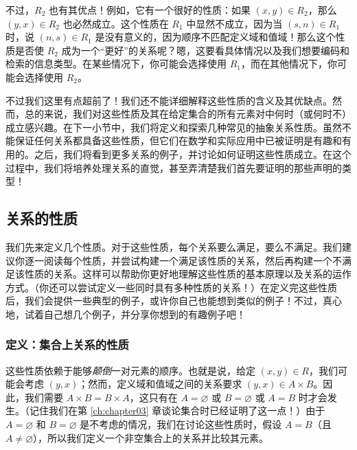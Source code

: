 不过，$R_2$ 也有其优点！例如，它有一个很好的性质：如果 $(x, y) \in R_2$，那么 $(y, x) \in R_2$ 也必然成立。这个性质在 $R_1$ 中显然不成立，因为当 $(s, n) \in R_1$ 时，说 $(n, s) \in R_1$ 是没有意义的，因为顺序不匹配定义域和值域！那么这个性质是否使 $R_2$ 成为一个``更好''的关系呢？嗯，这要看具体情况以及我们想要编码和检索的信息类型。在某些情况下，你可能会选择使用 $R_1$，而在其他情况下，你可能会选择使用 $R_2$。

不过我们这里有点超前了！我们还不能详细解释这些性质的含义及其优缺点。然而，总的来说，我们对这些性质及其在给定集合的所有元素对中何时（或何时不）成立感兴趣。在下一小节中，我们将定义和探索几种常见的抽象关系性质。虽然不能保证任何关系都具备这些性质，但它们在数学和实际应用中已被证明是有趣和有用的。之后，我们将看到更多关系的例子，并讨论如何证明这些性质成立。在这个过程中，我们将培养处理关系的直觉，甚至弄清楚我们首先要证明的那些声明的类型！

\subsection{关系的性质}

我们先来定义几个性质。对于这些性质，每个关系要么满足，要么不满足。我们建议你逐一阅读每个性质，并尝试构建一个满足该性质的关系，然后再构建一个不满足该性质的关系。这样可以帮助你更好地理解这些性质的基本原理以及关系的运作方式。（你还可以尝试定义一些同时具有多种性质的关系！）在定义完这些性质后，我们会提供一些典型的例子，或许你自己也能想到类似的例子！不过，真心地，试着自己想几个例子，并分享你想到的有趣例子吧！

\subsubsection*{定义：集合上关系的性质}

这些性质依赖于能够\emph{颠倒}一对元素的顺序。也就是说，给定 $(x, y) \in R$，我们可能会考虑 $(y, x)$；然而，定义域和值域之间的关系要求 $(y, x) \in A \times B$。因此，我们需要 $A \times B = B \times A$，这只有在 $A = \varnothing$ 或 $B = \varnothing$ 或 $A = B$ 时才会发生。（记住我们在第 \ref{ch:chapter03} 章谈论集合时已经证明了这一点！）由于 $A = \varnothing$ 和 $B = \varnothing$ 是不考虑的情况，我们在讨论这些性质时，假设 $A = B$（且 $A \ne \varnothing$），所以我们定义一个非空集合上的关系并比较其元素。

